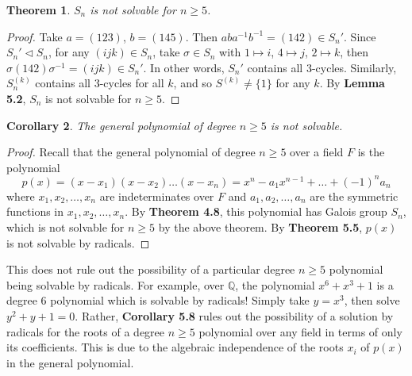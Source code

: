 \documentclass[12pt,leqno]{article}
\numberwithin{equation}{section}
\theoremstyle{plain}
\newtheorem{thm}{Theorem}[section]
\newtheorem{cor}[thm]{Corollary}
\theoremstyle{definition}
\theoremstyle{remark}
\begin{document}
\begin{thm}
 $S_n$ is not solvable for $n\geq5$.
\end{thm}

\begin{proof}
 Take $a=(123)$, $b=(145)$. Then $aba^{-1}b^{-1}=(142)\in S_n'$. Since $S_n'\lhd S_n$, for any $(ijk)\in S_n$, take $\sigma\in S_n$ with $1\mapsto i$, $4\mapsto j$, $2\mapsto k$, then $\sigma(142)\sigma^{-1}=(ijk)\in S_n'$. In other words, $S_n'$ contains all 3-cycles. Similarly, $S_n^{(k)}$ contains all 3-cycles for all $k$, and so $S^{(k)}\not=\{1\}$ for any $k$. By \textbf{Lemma 5.2}, $S_n$ is not solvable for $n\geq5$.
\end{proof}

\begin{cor}
 The general polynomial of degree $n\geq5$ is not solvable.
\end{cor}

\begin{proof}
 Recall that the general polynomial of degree $n\geq5$ over a field $F$ is the polynomial \[p(x)=(x-x_1)(x-x_2)\hdots(x-x_n)=x^n-a_1x^{n-1}+\hdots+(-1)^na_n\] where $x_1,x_2,\hdots,x_n$ are indeterminates over $F$ and $a_1,a_2,\hdots,a_n$ are the symmetric functions in $x_1,x_2,\hdots,x_n$. By \textbf{Theorem 4.8}, this polynomial has Galois group $S_n$, which is not solvable for $n\geq 5$ by the above theorem. By \textbf{Theorem 5.5}, $p(x)$ is not solvable by radicals.
\end{proof}

This does not rule out the possibility of a particular degree $n\geq5$ polynomial being solvable by radicals. For example, over $\mathbb{Q}$, the polynomial $x^6+x^3+1$ is a degree 6 polynomial which is solvable by radicals! Simply take $y=x^3$, then solve $y^2+y+1=0$.  Rather, \textbf{Corollary 5.8} rules out the possibility of a solution by radicals for the roots of a degree $n\geq5$ polynomial over any field in terms of only its coefficients. This is due to the algebraic independence of the roots $x_i$ of $p(x)$ in the general polynomial. 
\end{document}
